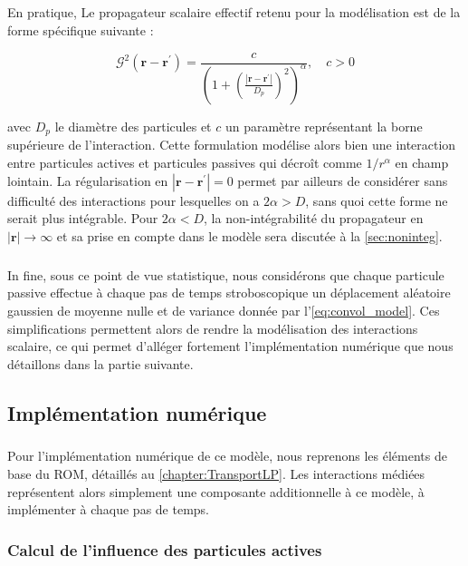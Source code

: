 \subparagraph{}En pratique, Le propagateur scalaire effectif retenu pour la modélisation est de la forme spécifique suivante :

\begin{equation}
	\mathcal{G}^2(\mathbf{r}-\mathbf{r}^\prime) = \frac{c}{\left(1+\left(\frac{|\mathbf{r}-\mathbf{r}^\prime|}{D_p}\right)^2\right)^\alpha}, \quad c > 0
\end{equation}

\noindent avec $D_p$ le diamètre des particules et $c$ un paramètre représentant la borne supérieure de l'interaction. Cette formulation modélise alors bien une interaction entre particules actives et particules passives qui décroît comme $1/r^\alpha$ en champ lointain. La régularisation en $|\mathbf{r}-\mathbf{r}^\prime|=0$ permet par ailleurs de considérer sans difficulté des interactions pour lesquelles on a $2\alpha > D$, sans quoi cette forme ne serait plus intégrable. Pour $2\alpha < D$, la non-intégrabilité du propagateur en $|\mathbf{r}|\rightarrow\infty$ et sa prise en compte dans le modèle sera discutée à la \autoref{sec:noninteg}.

\subparagraph{}In fine, sous ce point de vue statistique, nous considérons que chaque particule passive effectue à chaque pas de temps stroboscopique un déplacement aléatoire gaussien de moyenne nulle et de variance donnée par l'\autoref{eq:convol_model}. Ces simplifications permettent alors de rendre la modélisation des interactions scalaire, ce qui permet d'alléger fortement l'implémentation numérique que nous détaillons dans la partie suivante.

\subsection{Implémentation numérique}

\label{sec:ImplNumTBLRR}

\subparagraph{}Pour l'implémentation numérique de ce modèle, nous reprenons les éléments de base du ROM, détaillés au \autoref{chapter:TransportLP}. Les interactions médiées représentent alors simplement une composante additionnelle à ce modèle, à implémenter à chaque pas de temps. 

\subsubsection{Calcul de l'influence des particules actives}

